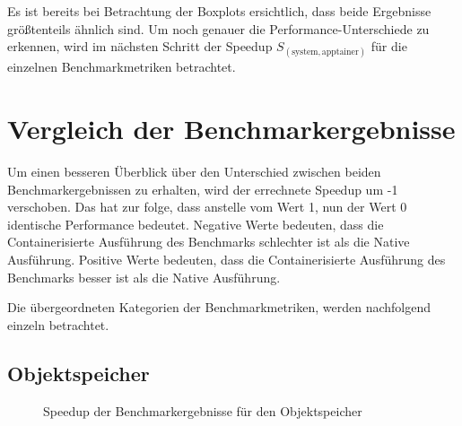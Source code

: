 Es ist bereits bei Betrachtung der Boxplots ersichtlich, dass beide Ergebnisse größtenteils ähnlich sind. Um noch genauer die Performance-Unterschiede zu erkennen, wird im nächsten Schritt der Speedup $S_(\text{system}, \text{apptainer})$ für die einzelnen Benchmarkmetriken betrachtet.

\section{Vergleich der Benchmarkergebnisse}

Um einen besseren Überblick über den Unterschied zwischen beiden Benchmarkergebnissen zu erhalten, wird der errechnete Speedup um -1 verschoben. Das hat zur folge, dass anstelle vom Wert 1, nun der Wert 0 identische Performance bedeutet. 
Negative Werte bedeuten, dass die Containerisierte Ausführung des Benchmarks schlechter ist als die Native Ausführung. Positive Werte bedeuten, dass die Containerisierte Ausführung des Benchmarks besser ist als die Native Ausführung. 

Die übergeordneten Kategorien der Benchmarkmetriken, werden nachfolgend einzeln betrachtet.

\subsection{Objektspeicher}

\begin{figure}
    \centering
    
    \caption{Speedup der Benchmarkergebnisse für den Objektspeicher}
    \label{fig:speedup_object}
\end{figure}

\FloatBarrier

